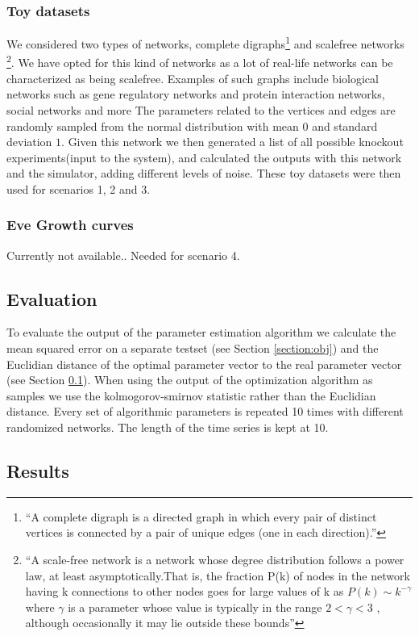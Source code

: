  \subsubsection{Toy datasets}
 We considered two types of networks, complete digraphs\footnote{``A complete digraph is a directed graph in which every pair of distinct vertices is connected by a pair of unique edges (one in each direction).''} and scalefree networks
\footnote{``A scale-free network is a network whose degree distribution follows a power law, at least asymptotically.That is, the fraction P(k) of nodes in the network having k connections to other nodes goes for large values of k as 
$ P(k) \sim k^{-\gamma} $ where $\gamma$ is a parameter whose value is typically in the range $2 < \gamma < 3$ \cite{barabasi2004network}, although occasionally it may lie outside these bounds''}. We have opted for this
kind of networks as a lot of real-life networks can be characterized as being scalefree. Examples of such graphs include biological networks such as gene regulatory networks and protein interaction networks, social networks and more \cite{barabasi2009scale}
The parameters related to the vertices and edges are randomly sampled from the normal distribution with mean $0$ and standard deviation $1$. Given this network we then generated a list of all possible knockout experiments(input to the system), and
calculated the outputs with this network and the simulator, adding different levels of noise. These toy datasets were then used for scenarios 1, 2 and 3.
 \subsubsection{Eve Growth curves}
 Currently not available.. Needed for scenario 4.
 \subsection{Evaluation}\label{sec:eval} 
To evaluate the output of the parameter estimation algorithm we calculate the mean squared error on a separate testset (see Section \ref{section:obj}) and the Euclidian distance of the optimal
parameter vector to the real parameter vector (see Section \ref{sec:eval}). When using the output of the optimization algorithm as samples we use the kolmogorov-smirnov statistic rather than
the Euclidian distance.
Every set of algorithmic parameters is repeated 10 times with different randomized networks. The length of the time series is kept at 10.

\subsection{Results}
